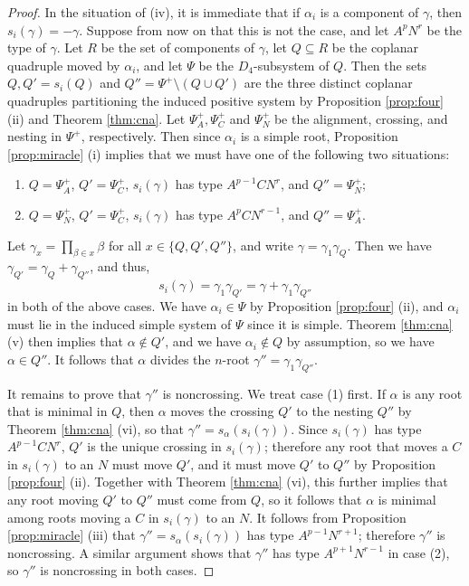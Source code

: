 \documentclass[11pt]{amsart}
\theoremstyle{plain}
\theoremstyle{definition}
\theoremstyle{remark}
\numberwithin{equation}{subsection}
\newcommand{\al}{\alpha}
\newcommand{\se}{\subseteq}
\begin{document}
\begin{proof}
In the situation of (iv), it is immediate that if $\al_i$ is a component of
$\gamma$, then $s_{i}(\gamma) = -\gamma$.  Suppose from now on that this is not
the case, and let $A^pN^r$ be the type of $\gamma$.  Let $R$ be the set of
components of $\gamma$, let $Q\se R$ be the coplanar quadruple moved by
$\al_{i}$, and let $\Psi$ be the $D_4$-subsystem of $Q$. Then the sets $Q,
Q'=s_i(Q)$ and $Q''=\Psi^+\setminus (Q\cup Q')$ are the three distinct coplanar
quadruples partitioning the induced positive system by Proposition
\ref{prop:four} (ii) and Theorem \ref{thm:cna}. Let $\Psi^+_A, \Psi^+_C$ and
$\Psi^+_N$ be the alignment, crossing, and nesting in $\Psi^+$, respectively.
Then since $\al_i$ is a simple root, Proposition \ref{prop:miracle} (i) implies
that we must have one of the following two situations:
\begin{enumerate}
    \item[(1)] $Q=\Psi^+_A$, $Q'=\Psi^+_C$, $s_i(\gamma)$ has type
         $A^{p-1}CN^r$, and $Q''=\Psi^+_N$;
     \item[(2)] $Q=\Psi^+_N$, $Q'=\Psi^+_C$, $s_i(\gamma)$ has type
         $A^pCN^{r-1}$, and $Q''=\Psi^+_A$.
 \end{enumerate} Let $\gamma_x=\prod_{\beta\in x}\beta$ for all $x\in
    \{Q,Q',Q''\}$, and write $\gamma=\gamma_1\gamma_Q$. Then we have
    $\gamma_{Q'}=\gamma_Q+\gamma_{Q''}$, and thus,
    \[s_i(\gamma)=\gamma_1\gamma_{Q'}=\gamma+\gamma_1\gamma_{Q''} \] in both of
    the above cases. We have $\al_i\in \Psi$ by Proposition \ref{prop:four}
    (ii), and $\al_i$ must lie in the induced simple system of $\Psi$ since it
    is simple. Theorem \ref{thm:cna} (v) then implies that $\al\notin Q'$, and
    we have $\al_i\notin Q$ by assumption, so we have $\al\in Q''$. It follows
    that $\al$ divides the $n$-root $\gamma''=\gamma_1\gamma_{Q''}$.

It remains to prove that $\gamma''$ is noncrossing.  We treat case (1) first.
If $\al$ is any root that is minimal in $Q$, then $\al$ moves the crossing $Q'$
to the nesting $Q''$ by Theorem \ref{thm:cna} (vi), so that
$\gamma''=s_\al(s_i(\gamma))$.  Since $s_i(\gamma)$ has type $A^{p-1}CN^r$, $Q'$
is the unique crossing in $s_i(\gamma)$; therefore any root that moves a $C$ in
$s_i(\gamma)$ to an $N$ must move $Q'$, and it must move $Q'$ to $Q''$ by
Proposition \ref{prop:four} (ii). Together with Theorem \ref{thm:cna} (vi), this
further implies that any root moving $Q'$ to $Q''$ must come from $Q$, so it
follows that $\al$ is minimal among roots moving a $C$ in $s_i(\gamma)$ to an
$N$. It follows from Proposition \ref{prop:miracle} (iii) that
$\gamma''=s_\al(s_i(\gamma))$ has type $A^{p-1}N^{r+1}$; therefore $\gamma''$ is
noncrossing. A similar argument shows that $\gamma''$ has type $A^{p+1}N^{r-1}$
in case (2), so $\gamma''$ is noncrossing in both cases.
\end{proof}
\end{document}
